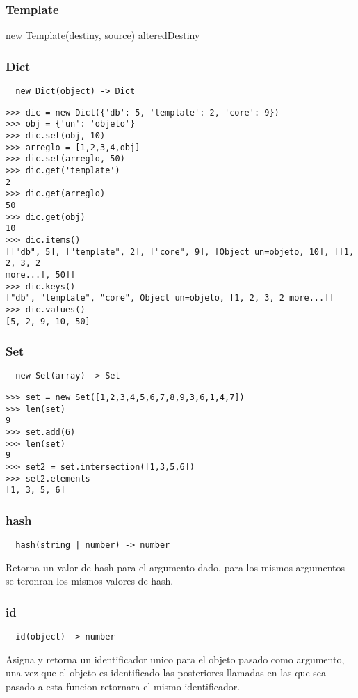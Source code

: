 \subsubsection*{Template}
new Template(destiny, source) \rightarrow alteredDestiny
\subsubsection*{Dict}
\begin{verbatim}
  new Dict(object) -> Dict
\end{verbatim}
\begin{lstlisting}[style=consola]
>>> dic = new Dict({'db': 5, 'template': 2, 'core': 9})
>>> obj = {'un': 'objeto'}
>>> dic.set(obj, 10)
>>> arreglo = [1,2,3,4,obj]
>>> dic.set(arreglo, 50)
>>> dic.get('template')
2
>>> dic.get(arreglo)
50
>>> dic.get(obj)
10
>>> dic.items()
[["db", 5], ["template", 2], ["core", 9], [Object un=objeto, 10], [[1, 2, 3, 2
more...], 50]]
>>> dic.keys()
["db", "template", "core", Object un=objeto, [1, 2, 3, 2 more...]]
>>> dic.values()
[5, 2, 9, 10, 50]
\end{lstlisting}

\subsubsection*{Set}
\begin{verbatim}
  new Set(array) -> Set
\end{verbatim}
\begin{lstlisting}[style=consola]
>>> set = new Set([1,2,3,4,5,6,7,8,9,3,6,1,4,7])
>>> len(set)
9
>>> set.add(6)
>>> len(set)
9
>>> set2 = set.intersection([1,3,5,6])
>>> set2.elements
[1, 3, 5, 6]
\end{lstlisting}

\subsubsection*{hash}
\begin{verbatim}
  hash(string | number) -> number
\end{verbatim}
Retorna un valor de hash para el argumento dado, para los mismos argumentos se
teronran los mismos valores de hash.

\subsubsection*{id}
\begin{verbatim}
  id(object) -> number
\end{verbatim}
Asigna y retorna un identificador unico para el objeto pasado como argumento,
una vez que el objeto es identificado las posteriores llamadas en las que sea
pasado a esta funcion retornara el mismo identificador.

